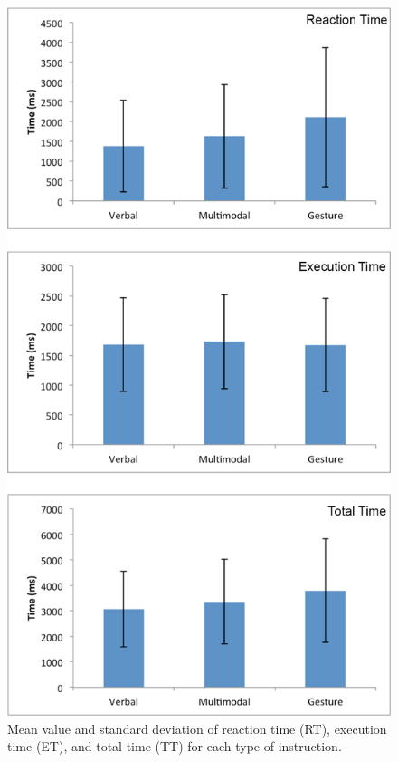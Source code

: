 \begin{figure}[ht]
  \centering
  \includegraphics[width=\textwidth]{figures/2_instruction}
  \caption{\label{fig:2_instruction}Mean value and standard deviation of reaction time (RT), execution time (ET), and total time (TT) for each type of instruction.}
\end{figure}

